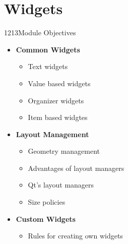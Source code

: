 %
%
%
%

\section{Widgets}

\begin{slide}{1213}{Module Objectives}
  \label{widgets}
  
  \begin{itemize}
  \item \textbf{Common Widgets}
    \begin{itemize}
    \item Text widgets
    \item Value based widgets
    \item Organizer widgets
    \item Item based widgtes
    \end{itemize}
  \item \textbf{Layout Management}
    \begin{itemize}
    \item Geometry management
    \item Advantages of layout managers
    \item Qt's layout managers
    \item Size policies
    \end{itemize}
  \item \textbf{Custom Widgets}
    \begin{itemize}
    \item Rules for creating own widgets
    \end{itemize}
  \end{itemize}

\end{slide}





